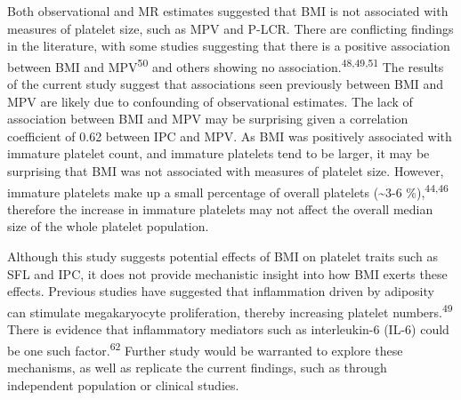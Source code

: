 \documentclass[11pt,twoside]{bristolthesis}
\begin{document}
Both observational and MR estimates suggested that BMI is not associated with measures of platelet size, such as MPV and P-LCR. There are conflicting findings in the literature, with some studies suggesting that there is a positive association between BMI and MPV\textsuperscript{50} and others showing no association.\textsuperscript{48,49,51} The results of the current study suggest that associations seen previously between BMI and MPV are likely due to confounding of observational estimates. The lack of association between BMI and MPV may be surprising given a correlation coefficient of 0.62 between IPC and MPV. As BMI was positively associated with immature platelet count, and immature platelets tend to be larger, it may be surprising that BMI was not associated with measures of platelet size. However, immature platelets make up a small percentage of overall platelets (\textasciitilde3-6 \%),\textsuperscript{44,46} therefore the increase in immature platelets may not affect the overall median size of the whole platelet population.

Although this study suggests potential effects of BMI on platelet traits such as SFL and IPC, it does not provide mechanistic insight into how BMI exerts these effects. Previous studies have suggested that inflammation driven by adiposity can stimulate megakaryocyte proliferation, thereby increasing platelet numbers.\textsuperscript{49} There is evidence that inflammatory mediators such as interleukin-6 (IL-6) could be one such factor.\textsuperscript{62} Further study would be warranted to explore these mechanisms, as well as replicate the current findings, such as through independent population or clinical studies.
\end{document}
